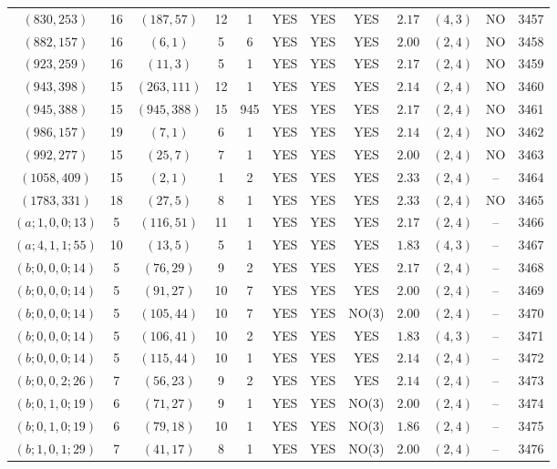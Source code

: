 \begin{longtable}{|c|c|c|c|c|c|c|c|c|c|c|c|}
$(830,253)$ & 16 & $(187,57)$ & 12 & 1 & YES & YES & YES & $2.17$ & $(4,3)$ & NO & 3457\\
$(882,157)$ & 16 & $(6,1)$ & 5 & 6 & YES & YES & YES & $2.00$ & $(2,4)$ & NO & 3458\\
$(923,259)$ & 16 & $(11,3)$ & 5 & 1 & YES & YES & YES & $2.17$ & $(2,4)$ & NO & 3459\\
$(943,398)$ & 15 & $(263,111)$ & 12 & 1 & YES & YES & YES & $2.14$ & $(2,4)$ & NO & 3460\\
$(945,388)$ & 15 & $(945,388)$ & 15 & 945 & YES & YES & YES & $2.17$ & $(2,4)$ & NO & 3461\\
$(986,157)$ & 19 & $(7,1)$ & 6 & 1 & YES & YES & YES & $2.14$ & $(2,4)$ & NO & 3462\\
$(992,277)$ & 15 & $(25,7)$ & 7 & 1 & YES & YES & YES & $2.00$ & $(2,4)$ & NO & 3463\\
$(1058,409)$ & 15 & $(2,1)$ & 1 & 2 & YES & YES & YES & $2.33$ & $(2,4)$ & -- & 3464\\
$(1783,331)$ & 18 & $(27,5)$ & 8 & 1 & YES & YES & YES & $2.33$ & $(2,4)$ & NO & 3465\\
$(a;1,0,0;13)$ & 5 & $(116,51)$ & 11 & 1 & YES & YES & YES & $2.17$ & $(2,4)$ & -- & 3466\\
$(a;4,1,1;55)$ & 10 & $(13,5)$ & 5 & 1 & YES & YES & YES & $1.83$ & $(4,3)$ & -- & 3467\\
$(b;0,0,0;14)$ & 5 & $(76,29)$ & 9 & 2 & YES & YES & YES & $2.17$ & $(2,4)$ & -- & 3468\\
$(b;0,0,0;14)$ & 5 & $(91,27)$ & 10 & 7 & YES & YES & YES & $2.00$ & $(2,4)$ & -- & 3469\\
$(b;0,0,0;14)$ & 5 & $(105,44)$ & 10 & 7 & YES & YES & NO(3) & $2.00$ & $(2,4)$ & -- & 3470\\
$(b;0,0,0;14)$ & 5 & $(106,41)$ & 10 & 2 & YES & YES & YES & $1.83$ & $(4,3)$ & -- & 3471\\
$(b;0,0,0;14)$ & 5 & $(115,44)$ & 10 & 1 & YES & YES & YES & $2.14$ & $(2,4)$ & -- & 3472\\
$(b;0,0,2;26)$ & 7 & $(56,23)$ & 9 & 2 & YES & YES & YES & $2.14$ & $(2,4)$ & -- & 3473\\
$(b;0,1,0;19)$ & 6 & $(71,27)$ & 9 & 1 & YES & YES & NO(3) & $2.00$ & $(2,4)$ & -- & 3474\\
$(b;0,1,0;19)$ & 6 & $(79,18)$ & 10 & 1 & YES & YES & NO(3) & $1.86$ & $(2,4)$ & -- & 3475\\
$(b;1,0,1;29)$ & 7 & $(41,17)$ & 8 & 1 & YES & YES & NO(3) & $2.00$ & $(2,4)$ & -- & 3476\\

\end{longtable}
